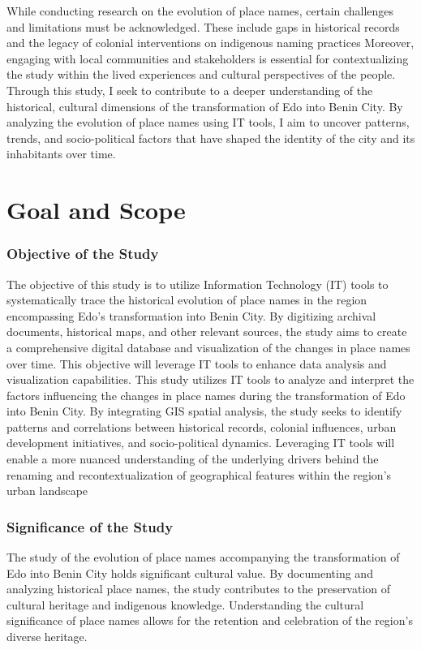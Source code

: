 While conducting research on the evolution of place names, certain challenges and limitations must be acknowledged. These include gaps in historical records and the legacy of colonial interventions on indigenous naming practices Moreover, engaging with local communities and stakeholders is essential for contextualizing the study within the lived experiences and cultural perspectives of the people.
Through this study, I seek to contribute to a deeper understanding of the historical, cultural dimensions of the transformation of Edo into Benin City. By analyzing the evolution of place names using IT tools, I aim to uncover patterns, trends, and socio-political factors that have shaped the identity of the city and its inhabitants over time.

\section{Goal and Scope}
\subsubsection{Objective of the Study}
The objective of this study is to utilize Information Technology (IT) tools to systematically trace the historical evolution of place names in the region encompassing Edo's transformation into Benin City. By digitizing archival documents, historical maps, and other relevant sources, the study aims to create a comprehensive digital database and visualization of the changes in place names over time. This objective will leverage IT tools to enhance data analysis and visualization capabilities.
This study utilizes IT tools to analyze and interpret the factors influencing the changes in place names during the transformation of Edo into Benin City. By integrating GIS spatial analysis, the study seeks to identify patterns and correlations between historical records, colonial influences, urban development initiatives, and socio-political dynamics. Leveraging IT tools will enable a more nuanced understanding of the underlying drivers behind the renaming and recontextualization of geographical features within the region's urban landscape
\subsubsection{Significance of the Study}
The study of the evolution of place names accompanying the transformation of Edo into Benin City holds significant cultural value. By documenting and analyzing historical place names, the study contributes to the preservation of cultural heritage and indigenous knowledge. Understanding the cultural significance of place names allows for the retention and celebration of the region's diverse heritage. 

